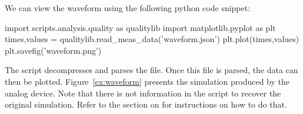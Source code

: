 We can view the waveform using the following python code snippet:

\begin{pysnippet}
  import scripts.analysis.quality as qualitylib
  import matplotlib.pyplot as plt
  times,values = qualitylib.read_meas_data('waveform.json')
  plt.plot(times,values)
  plt.savefig('waveform.png')
\end{pysnippet}

The  script decompresses and parses the  file. Once
this file is parsed, the data can then be plotted. Figure~\ref{ex:waveform} presents the
simulation produced by the analog device. Note that there is not information in
the \grendel script to recover the original simulation. Refer to the section on
\expdriver for instructions on how to do that.
